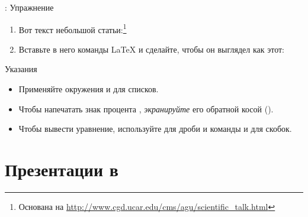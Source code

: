 \documentclass[usenames,dvipsnames]{beamer}
\begin{document}
\begin{frame}[fragile]{\insertsection: Упражнение}
\vspace{-3ex}
\begin{enumerate}
\item Вот текст небольшой статьи:\footnote{Основана на \url{http://www.cgd.ucar.edu/cms/agu/scientific_talk.html}}
\begin{center}
\end{center}
\item Вставьте в него команды \LaTeX{} и сделайте, чтобы он выглядел как этот:
\begin{center}
\end{center}
\end{enumerate}
\begin{tblock}{Указания}
\begin{itemize}
\item Применяйте окружения  и  для списков.
\item Чтобы напечатать знак процента \keystrokebftt{\%}, \emph{экранируйте} его обратной косой (\cmdbs{\%}).
\item Чтобы вывести уравнение, используйте  для дроби и команды
   и  для скобок.
\end{itemize}
\end{tblock}
\vspace{5pt}
\end{frame}

\section{Презентации в \protect{}}
\end{document}
